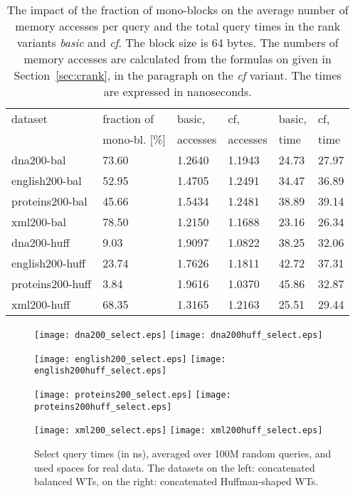 \documentclass{llncs}
\begin{document}
\begin{table}
\caption{The impact of the fraction of mono-blocks  on 
the average number of memory accesses per query and the total query times 
in the rank variants {\em basic} and {\em cf}.
The block size is 
64 bytes.
The numbers of memory accesses are calculated from the formulas on  
given in Section~\ref{sec:crank}, in the paragraph on the {\em cf} variant.
The times are expressed in nanoseconds.}
\label{table:cmisses}
\setlength{\tabcolsep}{0.45em}
\begin{tabular}{L{2.45cm} R{1.85cm} C{1.5cm} C{1.5cm} C{1.5cm} C{1.5cm}}
\toprule
dataset	   & fraction of   & basic,   & cf,      & basic, & cf,  \\
           & mono-bl. [\%] & accesses & accesses & time   & time \\
\midrule
dna200-bal       & 73.60 & 1.2640 & 1.1943 & 24.73 & 27.97 \\
english200-bal   & 52.95 & 1.4705 & 1.2491 & 34.47 & 36.89 \\
proteins200-bal  & 45.66 & 1.5434 & 1.2481 & 38.89 & 39.14 \\
xml200-bal       & 78.50 & 1.2150 & 1.1688 & 23.16 & 26.34 \\
dna200-huff      &  9.03 & 1.9097 & 1.0822 & 38.25 & 32.06 \\
english200-huff  & 23.74 & 1.7626 & 1.1811 & 42.72 & 37.31 \\
proteins200-huff &  3.84 & 1.9616 & 1.0370 & 45.86 & 32.87 \\
xml200-huff      & 68.35 & 1.3165 & 1.2163 & 25.51 & 29.44 \\
\bottomrule
\end{tabular}
\end{table}


\begin{figure}
\centerline{
\texttt{[image: dna200\_select.eps]}
\texttt{[image: dna200huff\_select.eps]}
}
\centerline{
\texttt{[image: english200\_select.eps]}
\texttt{[image: english200huff\_select.eps]}
}
\centerline{
\texttt{[image: proteins200\_select.eps]}
\texttt{[image: proteins200huff\_select.eps]}
}
\centerline{
\texttt{[image: xml200\_select.eps]}
\texttt{[image: xml200huff\_select.eps]}
}
\caption[Results]
{Select query times (in ns), averaged over 100M random queries, 
and used spaces for real data.
The datasets on the left: concatenated balanced WTs, 
on the right: concatenated Huffman-shaped WTs.}
\label{fig:cselects1}
\end{figure}
\end{document}
